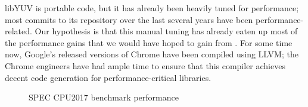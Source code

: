 libYUV is portable code, but it has already been heavily tuned for
performance; most commits to its repository over the last several
years have been performance-related.
%
Our hypothesis is that this manual tuning has already eaten up most of
the performance gains that we would have hoped to gain from \minotaur{}.
%
For some time now, Google's released versions of Chrome have been
compiled using LLVM; the Chrome engineers have had ample time to
ensure that this compiler achieves decent code generation for
performance-critical libraries.


\begin{figure}[tbp]
  \centering
  \hfill
  \caption{SPEC CPU2017 benchmark performance}
  \label{fig:spec}
\end{figure}

